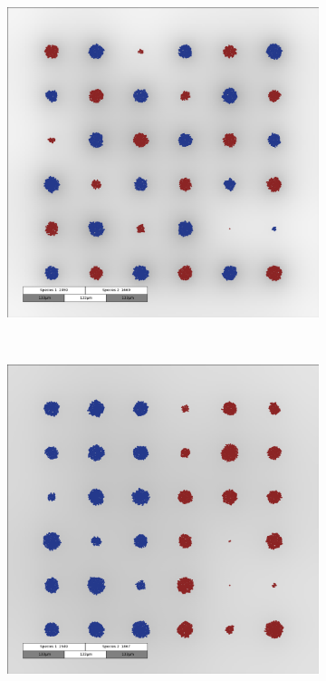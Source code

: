 \documentclass[10pt,A4paper]{article}
\numberwithin{equation}{section}
\begin{document}
\begin{figure}
\begin{subfigure}[c]{0.5\textwidth}
        \includegraphics[width=\textwidth]{Figures/abm-homogenous-low-diffusion/snapshot_00012000.png}
    \end{subfigure}\\
    \begin{subfigure}[c]{0.5\textwidth}
        \includegraphics[width=\textwidth]{Figures/abm-inhomogenous/snapshot_00012000.png}%

\end{subfigure}
\end{figure}
\end{document}
